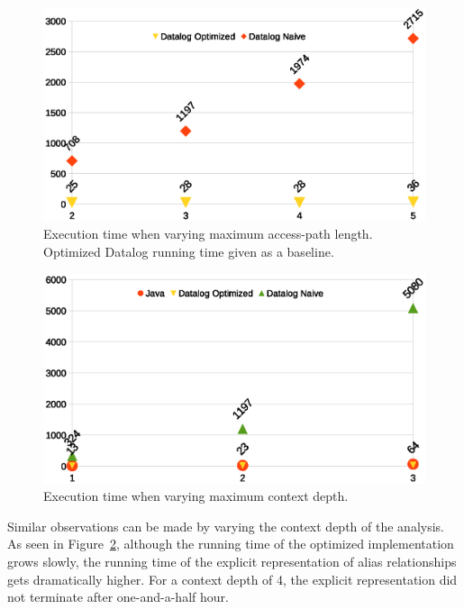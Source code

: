 \begin{figure}[htp]
\centering
\includegraphics[clip,width=\linewidth]{assets/must-data/length.eps}
\caption{Execution time when varying maximum access-path length. Optimized Datalog running time given as a baseline.}
\label{fig:must-data:aplength-chart}
\end{figure}



\begin{figure}[h!tp]
\centering
\includegraphics[clip,width=\linewidth]{assets/must-data/depth.eps}
\caption{Execution time when varying maximum context depth.}
\label{fig:must-data:ctxdepth-chart}
\end{figure}

Similar observations can be made by varying the context depth of the analysis. As seen in Figure~\ref{fig:must-data:ctxdepth-chart}, although the running time of the optimized implementation grows slowly, the running time of the explicit representation of alias relationships gets dramatically higher. For a context depth of 4, the explicit representation did not terminate after one-and-a-half hour.

